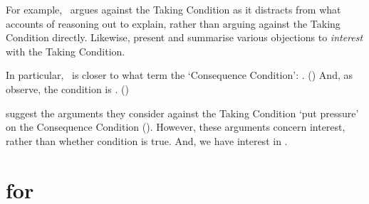 \begin{note}
{    For example,~\citeauthor{Hlobil:2014tq} argues against the Taking Condition as it distracts from what accounts of reasoning out to explain, rather than arguing against the Taking Condition directly.
    Likewise, \citeauthor{McHugh:2016vp} present and summarise various objections to \emph{interest} with the Taking Condition.

    In particular,~\supportI{} is closer to what \citeauthor{McHugh:2016vp} term the `Consequence Condition': .
    (\citeyear[316]{McHugh:2016vp})
    And, as \citeauthor{McHugh:2016vp} observe, the condition is .
    (\citeyear[316]{McHugh:2016vp})

    \citeauthor{McHugh:2016vp} suggest the arguments they consider against the Taking Condition `put pressure' on the Consequence Condition (\citeyear[327]{McHugh:2016vp}).
    However, these arguments concern interest, rather than whether condition is true.
    And, we have interest in .
  }
\end{note}

\section{ for }
\label{cha:ros:W}


